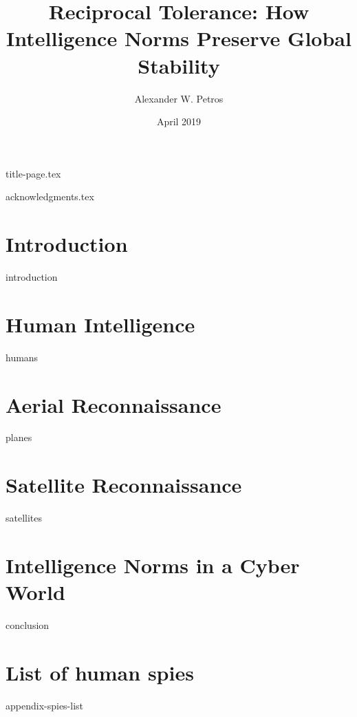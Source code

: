 \documentclass{memoir}
\title{Reciprocal Tolerance: How Intelligence Norms Preserve Global Stability}
\author{Alexander W. Petros}
\date{April 2019}
\begin{document}
    \frontmatter
    {title-page.tex}

    \tableofcontents
    \newpage
    \thispagestyle{empty}

    \listoffigures
    \listoftables

    {acknowledgments.tex}


    \mainmatter
    \chapter{Introduction}
    {introduction}

    \chapter{Human Intelligence}
    {humans}

    \chapter{Aerial Reconnaissance}
    {planes}

    \chapter{Satellite Reconnaissance}
    {satellites}

    \chapter{Intelligence Norms in a Cyber World}
    {conclusion}


    \appendix
    \chapter{List of human spies}
    {appendix-spies-list}
\end{document}
